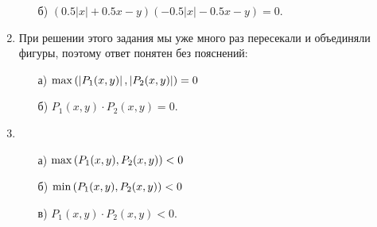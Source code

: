 \begin{enumerate}
\begin{enumerate}
	\item[б)] $(0.5 |x| + 0.5 x - y)(- 0.5 |x| - 0.5 x - y) = 0.$
\end{enumerate}

\item При решении этого задания мы уже много раз пересекали и объединяли фигуры, поэтому ответ понятен без пояснений:

\begin{enumerate}
	\item[а)] $\max \left( \left| P_1 (x,y) \right|, \left| P_2 (x,y) \right|\right) = 0$\scolon
	\item[б)] $P_1(x,y) \cdot P_2(x,y) = 0$.
\end{enumerate}

\item \begin{enumerate}
	\item[а)] $\max \left( P_1(x,y), P_2(x,y) \right) < 0$\scolon 
	\item[б)] $\min \left( P_1(x,y), P_2(x,y) \right) < 0$\scolon
	\item[в)] $P_1(x,y) \cdot P_2(x,y) < 0$.
\end{enumerate}

\end{enumerate}